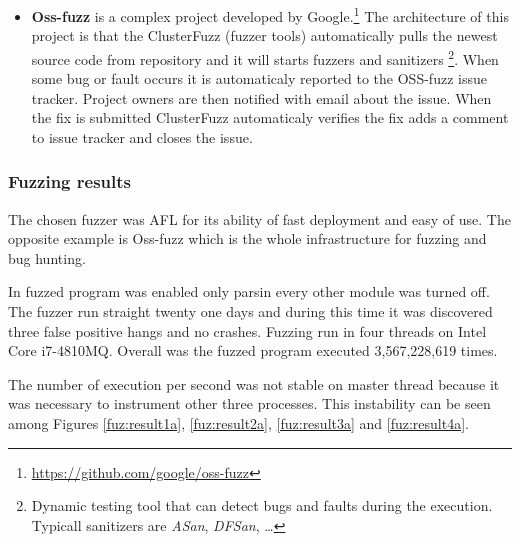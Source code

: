 \begin{itemize}
	\item \textbf{Oss-fuzz} is a complex project developed by Google.\footnote{\url{https://github.com/google/oss-fuzz}}
	The architecture of this project is that the ClusterFuzz (fuzzer tools)
	automatically pulls the newest source code from repository and it will starts
	fuzzers and sanitizers \footnote{Dynamic testing tool that can detect bugs and
	faults during the execution. Typicall sanitizers are \textit{ASan},
	\textit{DFSan}, \ldots}. When some bug or fault occurs it is automaticaly
	reported to the OSS-fuzz issue tracker. Project owners are then notified with
	email about the issue. When the fix is submitted ClusterFuzz automaticaly
	verifies the fix adds a comment to issue tracker and closes the issue.

\end{itemize}


\subsubsection{Fuzzing results}
The chosen fuzzer was AFL for its ability of fast deployment and easy of use.
The opposite example is Oss-fuzz which is the whole infrastructure for fuzzing and bug hunting.

In fuzzed program was enabled only parsin every other module was turned off.
The fuzzer run straight twenty one days and during this time it was discovered
three false positive hangs and no crashes. Fuzzing run in four threads on Intel
Core i7-4810MQ. Overall was the fuzzed program executed 3,567,228,619 times.

The number of execution per second was not stable on master thread because it
was necessary to instrument other three processes. This instability can be
seen among Figures \ref{fuz:result1a}, \ref{fuz:result2a}, \ref{fuz:result3a}
and \ref{fuz:result4a}.



